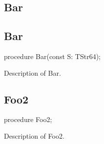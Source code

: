 \documentclass{report}
\newif\ifpdf
\begin{document}
\subsection*{\large{\textbf{Bar}}\normalsize\hspace{1ex}\hrulefill}
\else
\subsection*{Bar}
\fi
\label{ok_exports-Bar}
\begin{list}{}{
\setlength{\itemindent}{0cm}
\setlength{\listparindent}{0cm}
\setlength{\leftmargin}{\evensidemargin}
\addtolength{\leftmargin}{\tmplength}
\settowidth{\labelsep}{X}
\addtolength{\leftmargin}{\labelsep}
\setlength{\labelwidth}{\tmplength}
}
\item[\textbf{Declaration}\hfill]
\ifpdf
\begin{flushleft}
\fi
\begin{ttfamily}
procedure Bar(const S: TStr64);\end{ttfamily}

\ifpdf
\end{flushleft}
\fi

\par
\item[\textbf{Description}]
Description of Bar.

\end{list}
\ifpdf
\subsection*{\large{\textbf{Foo2}}\normalsize\hspace{1ex}\hrulefill}
\else
\subsection*{Foo2}
\fi
\label{ok_exports-Foo2}
\begin{list}{}{
\setlength{\itemindent}{0cm}
\setlength{\listparindent}{0cm}
\setlength{\leftmargin}{\evensidemargin}
\addtolength{\leftmargin}{\tmplength}
\settowidth{\labelsep}{X}
\addtolength{\leftmargin}{\labelsep}
\setlength{\labelwidth}{\tmplength}
}
\item[\textbf{Declaration}\hfill]
\ifpdf
\begin{flushleft}
\fi
\begin{ttfamily}
procedure Foo2;\end{ttfamily}

\ifpdf
\end{flushleft}
\fi

\par
\item[\textbf{Description}]
Description of Foo2.

\end{list}
\end{document}
